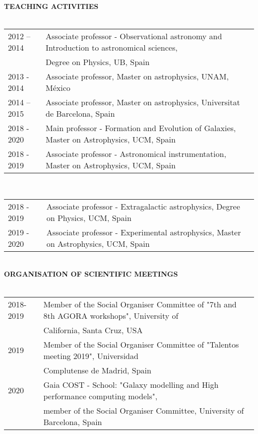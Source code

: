 \documentclass[oneside, a4paper, onecolumn, 11pt]{article}
\begin{document}
{{\bf TEACHING ACTIVITIES}\\
\\
\begin{tabular}{ll}
2012 – 2014  & 	Associate professor - Observational astronomy and Introduction to astronomical sciences,\\ & Degree on Physics, UB, Spain\\
2013 - 2014 & 	Associate professor, Master on astrophysics, UNAM, México\\
2014 – 2015  & 	Associate professor, Master on astrophysics, Universitat de Barcelona, Spain\\
2018 - 2020 & Main professor - Formation and Evolution of Galaxies, Master on  Astrophysics, UCM, Spain\\
2018 - 2019 & Associate professor - Astronomical instrumentation, Master on Astrophysics, UCM, Spain\\
\end{tabular}\\
\begin{tabular}{ll}
2018 - 2019 & Associate professor - Extragalactic astrophysics, Degree on Physics, UCM, Spain\\
2019 - 2020 & Associate professor - Experimental astrophysics, Master on Astrophysics, UCM, Spain\\
\end{tabular}\\

{\bf ORGANISATION OF SCIENTIFIC MEETINGS}\\
\\
\begin{tabular}{ll}
2018-2019 & Member of the Social Organiser Committee of "7th and 8th AGORA workshops", University of \\
 & California, Santa Cruz, USA \\
2019 & Member of the Social Organiser Committee of "Talentos meeting 2019", Universidad \\
 & Complutense de Madrid, Spain \\
2020 & Gaia COST - School: "Galaxy modelling and High performance computing models", \\
 & member of the Social Organiser Committee, University of Barcelona, Spain \\
\end{tabular}\\

}
\end{document}
